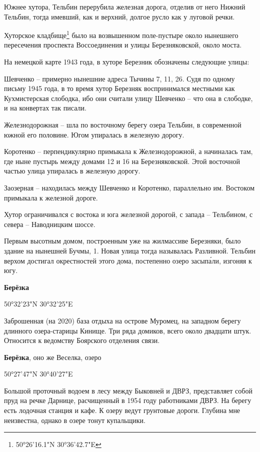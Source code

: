 Южнее хутора, Тельбин перерубила железная дорога, отделив от него Нижний Тельбин, тогда имевший, как и верхний, долгое русло как у луговой речки.

Хуторское кладбище\footnote{50°26'16.1"N 30°36'42.7"E} было на возвышенном поле-пустыре около нынешнего пересечения проспекта Воссоединения и улицы Березняковской, около моста.

На немецкой карте 1943 года, в хуторе Березник обозначены следующие улицы: 

Шевченко – примерно нынешние адреса Тычины 7, 11, 26. Судя по одному письму 1945 года, в то время хутор Березняк воспринимался местными как Кухмистерская слободка, ибо они считали улицу Шевченко – что она в слободке, и на конвертах так писали.

Железнодорожная – шла по восточному берегу озера Тельбин, в современной южной его половине. Югом упиралась в железную дорогу.

Коротенко – перпендикулярно примыкала к Железнодорожной, а начиналась там, где ныне пустырь между домами 12 и 16 на Березняковской. Этой восточной частью улица упиралась в железную дорогу.

Заозерная – находилась между Шевченко и Коротенко, параллельно им. Востоком примыкала к железной дороге.

Хутор ограничивался с востока и юга железной дорогой, с запада – Тельбином, с севера – Наводницким шоссе.

Первым высотным домом, построенным уже на жилмассиве Березняки, было здание на нынешней Бучмы, 1. Новая улица тогда называлась Разливной. Тельбин верхом достигал окре\-стностей этого дома, постепенно озеро засып\'али, изгоняя к югу.\\

\medskip

\textbf{Берёзка} 

50°32'23"N 30°32'25"E

Заброшенная (на 2020) база отдыха на острове Муромец, на западном берегу длинного озера-старицы Кинище. Три ряда домиков, всего около двадцати штук. Относится к ведомству Боярского отделения связи.\\

\medskip

\textbf{Берёзка}, оно же Веселка, озеро

50°27'47"N 30°40'27"E

Большой проточный водоем в лесу между Быковней и ДВРЗ, представляет собой пруд на речке Дарнице, расчищенный в 1954 году работниками ДВРЗ. На берегу есть лодочная станция и кафе. К озеру ведут грунтовые дороги. Глубина мне неизвестна, однако в озере тонут купальщики.

